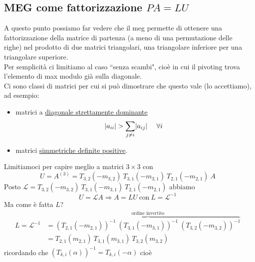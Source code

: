 \subsection{MEG come fattorizzazione $PA=LU$}
A questo punto possiamo far vedere che il meg permette di ottenere una fattorizzazione della matrice di partenza (a meno di una permutazione delle righe) nel prodotto di due matrici triangolari, una triangolare inferiore per una triangolare superiore.\\
Per semplicità ci limitiamo al caso ``senza scambi", cioè in cui il pivoting trova l'elemento di max modulo già sulla diagonale.\\
Ci sono classi di matrici per cui si può dimostrare che questo vale (lo accettiamo), ad esempio:
\begin{itemize}
    \item matrici a \uline{diagonale strettamente dominante}
    \[
        \lvert a_{ii}\rvert > \sum_{j \neq i} \lvert a_{ij}\rvert \  \  \  \ \forall i
    \]
    
    \item matrici \uline{simmetriche definite positive}. \end{itemize} Limitiamoci per capire meglio a matrici $3 \times 3$ con
    \[
    U = A^{(3)} = T_{3,2} (-m_{3,2}) \ T_{3,1} (-m_{3,1}) \ T_{2,1} (-m_{2,1}) \ A
    \]
    Posto $\mathcal{L} = T_{3,2} (-m_{3,2}) \ T_{3,1} (-m_{3,1}) \ T_{2,1} (-m_{2,1})$ abbiamo
    \[
    U = \mathcal{L}A \Rightarrow A = LU \ \text{con} \ L = \mathcal{L}^{-1}
    \]
    Ma come è fatta $L$?
    \[
    \begin{split}
        L = \mathcal{L}^{-1} & = \overbrace{(T_{2,1} (-m_{2,1}))^{-1} \ (T_{3,1} (-m_{3,1}))^{-1} \ (T_{3,2} (-m_{3,2}))^{-1}}^{\text{ordine invertito}} \\
        & = T_{2,1} (m_{2,1}) \ T_{3,1} (m_{3,1}) \ T_{3,2} (m_{3,2})
    \end{split}
    \]
    ricordando che $(T_{k,i} (\alpha))^{-1} = T_{k, i} (-\alpha)$ cioè
